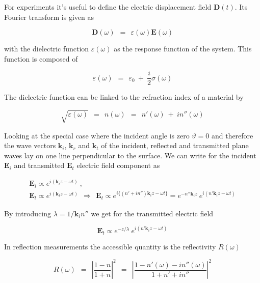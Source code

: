 \documentclass[10pt]{report}
\numberwithin{equation}{chapter}
\newcommand{\vc}[1]{ %
  \mathbf{#1}
}
\begin{document}
For experiments it's useful to define the electric displacement field $\vc{D}(t)$. Its Fourier transform is given as

\begin{equation}
  \vc{D}(\omega) ~~=~~ \varepsilon(\omega) \vc{E}(\omega)
\end{equation}

with the dielectric function $\varepsilon(\omega)$ as the response function of the system. This function is composed of 

\begin{equation}
  \varepsilon(\omega) ~~=~~ \varepsilon_0 ~+~ \frac{i}{2}\sigma(\omega)
\end{equation}

The dielectric function can be linked to the refraction index of a material by

\begin{equation} \label{eq:refrac_index}
  \sqrt{\varepsilon(\omega)} ~~=~~ n(\omega) ~~=~~ n'(\omega) ~+~ in''(\omega)
\end{equation}


Looking at the special case where the incident angle is zero $\vartheta = 0$ and therefore the wave vectors $\vc{k}_i$, $\vc{k}_r$ and $\vc{k}_t$ of the incident, reflected and transmitted plane waves lay on one line perpendicular to the surface. We can write for the incident $\vc{E}_i$ and transmitted $\vc{E}_t$ electric field component as

\begin{gather} 
  \vc{E}_i \propto e^{i(\vc{k}_i z - \omega t)} ~, \nonumber \\
  \vc{E}_t \propto e^{i(\vc{k}_t z - \omega t)} ~~\Rightarrow~~ \vc{E}_t \propto e^{i\{(n'+in'')\vc{k}_i z - \omega t\}} = e^{-n''\vc{k}_i z}\ e^{i(n' \vc{k}_i z - \omega t)} 
\end{gather}


By introducing $\lambda = 1/\vc{k}_i n''$ we get for the transmitted electric field

\begin{equation}
  \vc{E}_t \propto e^{-z/\lambda}\ e^{i(n'\vc{k}_i z - \omega t)}
\end{equation}

In reflection measurements the accessible quantity is the reflectivity $R(\omega)$

\begin{equation}
  R(\omega) ~~=~~ \left| \frac{1-n}{1+n} \right|^2 
  ~~=~~ \left| \frac{1-n'(\omega) - i n''(\omega)}{1 + n' + in''} \right|^2
\end{equation}
\end{document}
